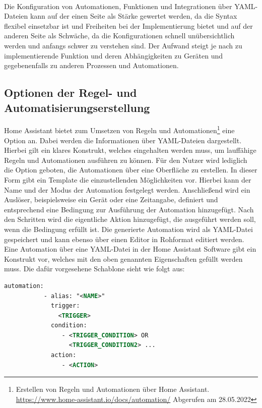     \\
    Die Konfiguration von Automationen, Funktionen und Integrationen über YAML-Dateien kann auf der einen Seite als Stärke gewertet werden, 
    da die Syntax flexibel einsetzbar ist und Freiheiten bei der Implementierung bietet und auf der anderen Seite als Schwäche, da die 
    Konfigurationen schnell unübersichtlich werden und anfangs schwer zu verstehen sind. Der Aufwand steigt je nach zu implementierende 
    Funktion und deren Abhängigkeiten zu Geräten und gegebenenfalls zu anderen Prozessen und Automationen. 

    \subsection{Optionen der Regel- und Automatisierungserstellung}
        Home Assistant bietet zum Umsetzen von Regeln und Automationen\footnote{Erstellen von Regeln und Automationen über Home Assistant. \url{https://www.home-assistant.io/docs/automation/} Abgerufen am 28.05.2022} 
        eine Option an. Dabei werden die Informationen über 
        YAML-Dateien dargestellt. Hierbei gilt ein klares Konstrukt, welches eingehalten werden muss, um lauffähige Regeln 
        und Automationen ausführen zu können. Für den Nutzer wird lediglich die Option geboten, die Automationen über eine 
        Oberfläche zu erstellen. In dieser Form gibt ein Template die einzustellenden Möglichkeiten vor. Hierbei kann 
        der Name und der Modus der Automation festgelegt werden. Anschließend wird ein Auslöser, beispielsweise ein Gerät 
        oder eine Zeitangabe, definiert und entsprechend eine Bedingung zur Ausführung der Automation hinzugefügt. Nach den 
        Schritten wird die eigentliche Aktion hinzugefügt, die ausgeführt werden soll, wenn die Bedingung erfüllt ist. Die 
        generierte Automation wird als YAML-Datei gespeichert und kann ebenso über einen Editor in Rohformat editiert werden. 
        Eine Automation über eine YAML-Datei in der Home Assistant Software gibt ein Konstrukt vor, welches mit den oben 
        genannten Eigenschaften gefüllt werden muss. Die dafür vorgesehene Schablone sieht wie folgt aus: 
        \\
        \linebreak
        \begin{lstlisting}[language=xml, frame=lines, xleftmargin=\parindent, style=algoBericht, label={code:YAML}, captionpos=b, caption={Konstrukt zur Regeldefinition über Home Assistant}]
        automation:
           - alias: "<NAME>"
             trigger:
               <TRIGGER>
             condition:
                - <TRIGGER_CONDITION> OR
                  <TRIGGER_CONDITION2> ...
             action:
                - <ACTION>
        \end{lstlisting}

